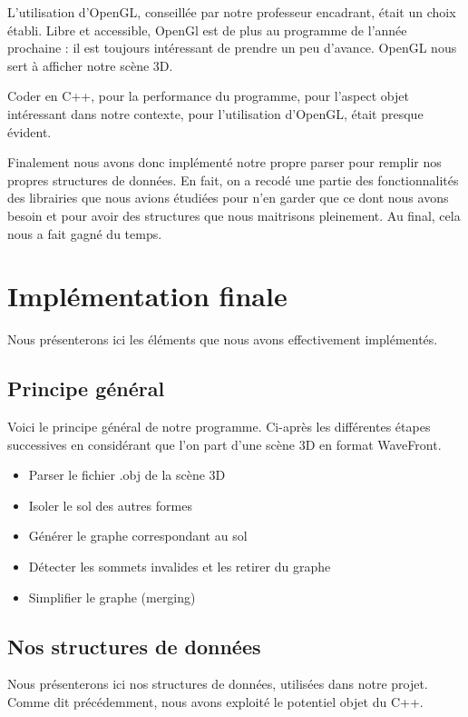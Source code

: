 \documentclass[a4paper,12pt]{report}
\begin{document}
L'utilisation d'OpenGL, conseillée par notre professeur encadrant, était un choix établi. Libre et accessible, OpenGl est de plus au programme de l'année prochaine : il est toujours intéressant de prendre un peu d'avance. OpenGL nous sert à afficher notre scène 3D.

Coder en C++, pour la performance du programme, pour l'aspect objet intéressant dans notre contexte, pour l'utilisation d'OpenGL, était presque évident.

Finalement nous avons donc implémenté notre propre parser pour remplir nos propres structures de données. En fait, on a recodé une partie des fonctionnalités des librairies que nous avions étudiées pour n'en garder que ce dont nous avons besoin et pour avoir des structures que nous maitrisons pleinement. Au final, cela nous a fait gagné du temps.


\chapter{Implémentation finale}

Nous présenterons ici les éléments que nous avons effectivement implémentés.

\section{Principe général}

Voici le principe général de notre programme. Ci-après les différentes étapes successives en considérant que l'on part d'une scène 3D en format WaveFront.

\begin{itemize}
 \item Parser le fichier .obj de la scène 3D
 \item Isoler le sol des autres formes
 \item Générer le graphe correspondant au sol
 \item Détecter les sommets invalides et les retirer du graphe
 \item Simplifier le graphe (merging)
\end{itemize}

\section{Nos structures de données}

Nous présenterons ici nos structures de données, utilisées dans notre projet. Comme dit précédemment, nous avons exploité le potentiel objet du C++.
\end{document}

